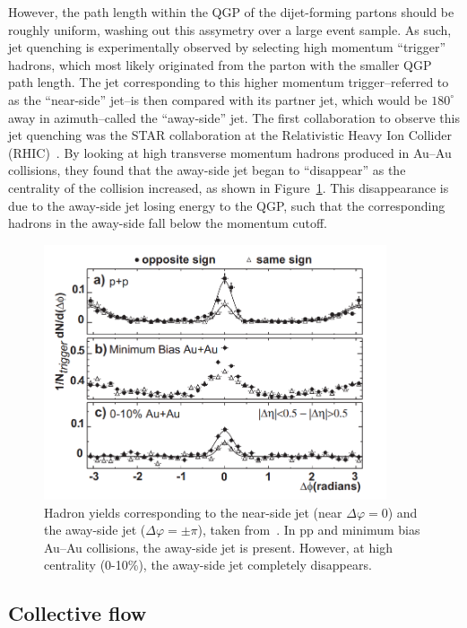 However, the path length within the QGP of the dijet-forming partons should be roughly uniform, washing out this assymetry over a large event sample. As such, jet quenching is experimentally observed by selecting high momentum ``trigger'' hadrons, which most likely originated from the parton with the smaller QGP path length. The jet corresponding to this higher momentum trigger--referred to as the ``near-side'' jet--is then compared with its partner jet, which would be $180^\circ$ away in azimuth--called the ``away-side'' jet. The first collaboration to observe this jet quenching was the STAR collaboration at the Relativistic Heavy Ion Collider (RHIC)~\cite{STARJetQuenching}. By looking at high transverse momentum hadrons produced in Au--Au collisions, they found that the away-side jet began to ``disappear'' as the centrality of the collision increased, as shown in Figure~\ref{fig:star_jet_quenching}. This disappearance is due to the away-side jet losing energy to the QGP, such that the corresponding hadrons in the away-side fall below the momentum cutoff.

\begin{figure}
    \centering
    \includegraphics[width=0.9\textwidth]{figures/introduction/star_jet_quenching.png}
    \caption{Hadron yields corresponding to the near-side jet (near $\Delta\varphi = 0$) and the away-side jet ($\Delta\varphi = \pm \pi$), taken from~\cite{STARJetQuenching}. In pp and minimum bias Au--Au collisions, the away-side jet is present. However, at high centrality (0-10\%), the away-side jet completely disappears.}
    \label{fig:star_jet_quenching}
\end{figure}


\subsection{Collective flow}
\label{sec:collective_flow}

